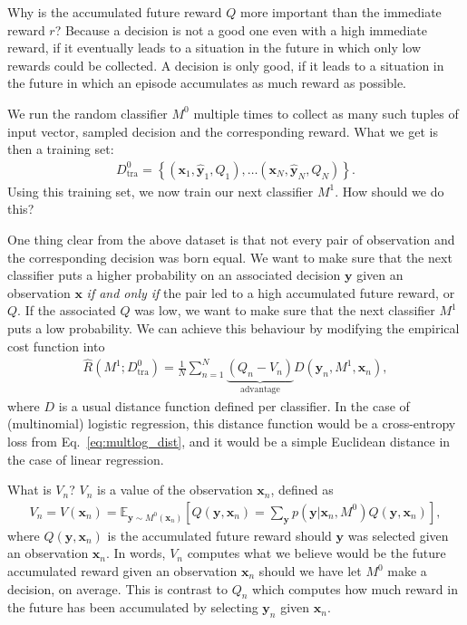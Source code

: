 \documentclass{report}
\newcommand{\vect}[1]{\mathbf{#1}}
\newcommand{\vx}[0]{\vect{x}}
\newcommand{\vy}[0]{\vect{y}}
\newcommand{\E}[0]{\mathbb{E}}
\newcommand{\tra}{\text{tra}}
\begin{document}
Why is the accumulated future reward $Q$ more important than the immediate
reward $r$? Because a decision is not a good one even with a high immediate
reward, if it eventually leads to a situation in the future in which only low
rewards could be collected. A decision is only good, if it leads to a situation
in the future in which an episode accumulates as much reward as possible. 

We run the random classifier $M^0$ multiple times to collect as many such tuples
of input vector, sampled decision and the corresponding reward. What we get is
then a training set:
\begin{align*}
    D_{\tra}^0 = \left\{ 
        (\vx_1, \hat{\vy}_1, Q_1), 
        \ldots
        (\vx_N, \hat{\vy}_N, Q_N)
    \right\}.
\end{align*}
Using this training set, we now train our next classifier $M^1$. How should we
do this?

One thing clear from the above dataset is that not every pair of observation and
the corresponding decision was born equal. We want to make sure that the next
classifier puts a higher probability on an associated decision $\vy$ given an
observation $\vx$ {\it if and only if} the pair led to a high accumulated future
reward, or $Q$. If the associated $Q$ was low, we want to make sure that the
next classifier $M^1$ puts a low probability. We can achieve this behaviour by
modifying the empirical cost function into
\begin{align}
    \label{eq:policy_gradient}
    \hat{R}(M^1; D_{\tra}^0) = \frac{1}{N} \sum_{n=1}^N 
    \underbrace{(Q_n - V_n)}_{\text{advantage}}
    D(\vy_n, M^1, \vx_n),
\end{align}
where $D$ is a usual distance function defined per classifier. In the case of
(multinomial) logistic regression, this distance function would be a
cross-entropy loss from Eq.~\eqref{eq:multlog_dist}, and it would be a simple
Euclidean distance in the case of linear regression. 

What is $V_n$? $V_n$ is a value of the observation $\vx_n$, defined as
\begin{align*}
    V_n = V(\vx_n) = \E_{\vy \sim M^0(\vx_n)} \left[
        Q(\vy, \vx_n) = \sum_{\vy} p(\vy|\vx_n, M^0) Q(\vy, \vx_n)
    \right],
\end{align*}
where $Q(\vy, \vx_n)$ is the accumulated future reward should $\vy$ was selected
given an observation $\vx_n$. In words, $V_n$ computes what we believe would be
the future accumulated reward given an observation $\vx_n$ should we have let
$M^0$ make a decision, on average. This is contrast to $Q_n$ which computes how
much reward in the future has been accumulated by selecting $\vy_n$ given
$\vx_n$.
\end{document}
